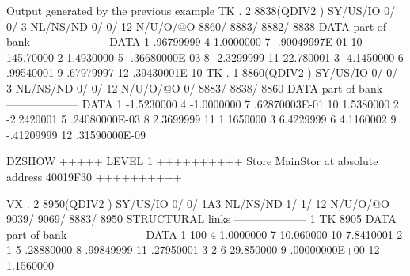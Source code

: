 \begin{Listing}{Output generated by the previous example}
 TK  .     2     8838(QDIV2   ) SY/US/IO    0/    0/   3 NL/NS/ND    0/    0/      12 N/U/O/@O    8860/    8883/    8882/    8838
DATA part of bank                                         --------------------                                                   
DATA      1     .96799999         4     1.0000000         7    -.90049997E-01    10     145.70000                                
          2     1.4930000         5    -.36680000E-03     8    -2.3299999        11     22.780001                                
          3    -4.1450000         6     .99540001         9     .67979997        12     .39430001E-10                            
 TK  .     1     8860(QDIV2   ) SY/US/IO    0/    0/   3 NL/NS/ND    0/    0/      12 N/U/O/@O       0/    8883/    8838/    8860
DATA part of bank                                         --------------------                                                   
DATA      1    -1.5230000         4    -1.0000000         7     .62870003E-01    10     1.5380000                                
          2    -2.2420001         5     .24080000E-03     8     2.3699999        11     1.1650000                                
          3     6.4229999         6     4.1160002         9    -.41209999        12     .31590000E-09                            
                                                                                                                                 
DZSHOW  +++++ LEVEL     1 ++++++++++            Store  MainStor at absolute address 40019F30      ++++++++++                     
                                                                                                                                 
 VX  .     2     8950(QDIV2   ) SY/US/IO    0/    0/ 1A3 NL/NS/ND    1/    1/      12 N/U/O/@O    9039/    9069/    8883/    8950
STRUCTURAL links                                          --------------------                                                   
          1    TK        8905                                                                                                    
DATA part of bank                                         --------------------                                                   
DATA      1               100     4     1.0000000         7     10.060000        10     7.8410001                                
          2                 1     5     .28880000         8     .99849999        11     .27950001                                
          3                 2     6     29.850000         9     .00000000E+00    12     1.1560000                                
                                                                                                                                 

\end{Listing}
